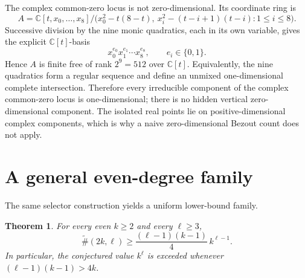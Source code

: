 \documentclass[a4paper,11pt]{amsart}
\newtheorem{theorem}{Theorem}[section]
\theoremstyle{remark}
\newcommand{\C}{\mathbb C}
\begin{document}
The complex common-zero locus is not zero-dimensional. Its coordinate ring is
\[
 A=\C[t,x_0,\ldots,x_8]/
 \bigl(x_0^2-t(8-t),\ x_i^2-(t-i+1)(t-i):1\le i\le8\bigr).
\]
Successive division by the nine monic quadratics, each in its own variable, gives the explicit $\C[t]$-basis
\[
 x_0^{e_0}x_1^{e_1}\cdots x_8^{e_8},\qquad e_i\in\{0,1\}.
\]
Hence $A$ is finite free of rank $2^9=512$ over $\C[t]$. Equivalently, the nine quadratics form a regular sequence and define an unmixed one-dimensional complete intersection. Therefore every irreducible component of the complex common-zero locus is one-dimensional; there is no hidden vertical zero-dimensional component. The isolated real points lie on positive-dimensional complex components, which is why a naive zero-dimensional Bezout count does not apply.

\section{A general even-degree family}

The same selector construction yields a uniform lower-bound family.

\begin{theorem}\label{thm:family}
For every even $k\ge2$ and every $\ell\ge3$,
\begin{equation}\label{eq:familybound}
 \widetilde{\#}(2k,\ell)
 \ge \frac{(\ell-1)(k-1)}4\,k^{\ell-1}.
\end{equation}
In particular, the conjectured value $k^\ell$ is exceeded whenever
$(\ell-1)(k-1)>4k$.
\end{theorem}
\end{document}
